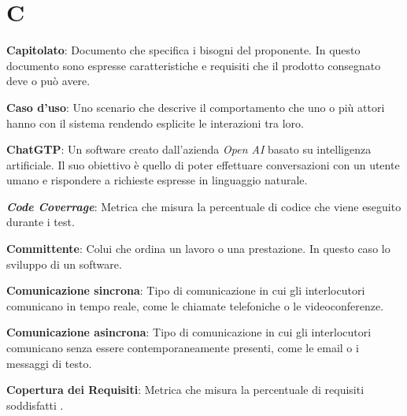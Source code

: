 \documentclass[5pt]{article}
\begin{document}
\section*{C}
\begin{flushleft}

\textbf{Capitolato}: Documento che specifica i bisogni del proponente. In questo documento sono espresse caratteristiche e requisiti che il prodotto consegnato deve o può avere.\newline

\textbf{Caso d'uso}: Uno scenario che descrive il comportamento che uno o più attori hanno con il sistema rendendo esplicite le interazioni tra loro.\newline

\textbf{ChatGTP}: Un software creato dall'azienda \textit{Open AI} basato su intelligenza artificiale. Il suo obiettivo è quello di poter effettuare conversazioni con un utente umano e rispondere a richieste espresse in linguaggio naturale.\newline

\textbf{\textit{Code Coverrage}}: Metrica che misura la percentuale di codice che viene eseguito durante i test.\newline

\textbf{Committente}: Colui che ordina un lavoro o una prestazione. In questo caso lo sviluppo di un software.\newline

\textbf{Comunicazione sincrona}: Tipo di comunicazione in cui gli interlocutori comunicano in tempo reale, come le chiamate telefoniche o le videoconferenze.\newline

\textbf{Comunicazione asincrona}: Tipo di comunicazione in cui gli interlocutori comunicano senza essere contemporaneamente presenti, come le email o i messaggi di testo.\newline

\textbf{Copertura dei Requisiti}: Metrica che misura la percentuale di requisiti soddisfatti .\newline


\end{flushleft}
\end{document}
